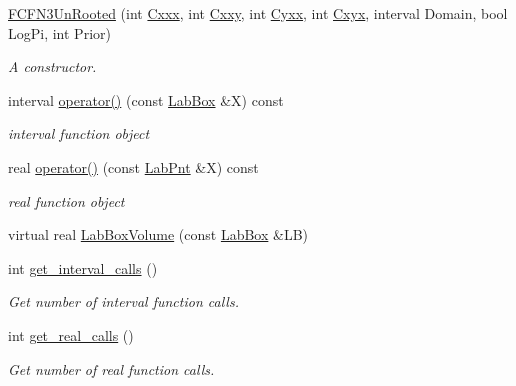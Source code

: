 \begin{DoxyCompactItemize}
\item 
\hyperlink{classFCFN3UnRooted_a5f4f860f6a018258d428ac99b745b909}{\-F\-C\-F\-N3\-Un\-Rooted} (int \hyperlink{classFCFN3UnRooted_a52b3db1c0464e43eb76fd9c2f85f3adb}{\-Cxxx}, int \hyperlink{classFCFN3UnRooted_a9ef322fbaba733780643eb3f748c61e8}{\-Cxxy}, int \hyperlink{classFCFN3UnRooted_a8a1912c84680898ee998bfcc8e59cab2}{\-Cyxx}, int \hyperlink{classFCFN3UnRooted_aee129a305aebfe530f9025bdc5a64c22}{\-Cxyx}, interval \-Domain, bool \-Log\-Pi, int \-Prior)
\begin{DoxyCompactList}\small\item\em \-A constructor. \end{DoxyCompactList}\item 
interval \hyperlink{classFCFN3UnRooted_abaaaa5afcbd3a3c9baa2c6afb58bb5d6}{operator()} (const \hyperlink{classLabBox}{\-Lab\-Box} \&\-X) const 
\begin{DoxyCompactList}\small\item\em interval function object \end{DoxyCompactList}\item 
real \hyperlink{classFCFN3UnRooted_a598796f5e3db2e01ad871ab84833a1fb}{operator()} (const \hyperlink{classLabPnt}{\-Lab\-Pnt} \&\-X) const 
\begin{DoxyCompactList}\small\item\em real function object \end{DoxyCompactList}\item 
virtual real \hyperlink{classFCFN3UnRooted_aae39656be045741eddc3590529aec2b6}{\-Lab\-Box\-Volume} (const \hyperlink{classLabBox}{\-Lab\-Box} \&\-L\-B)
\item 
int \hyperlink{classFCFN3UnRooted_a8cd2bfdf21a3f8a8109dce3a80833b98}{get\-\_\-interval\-\_\-calls} ()
\begin{DoxyCompactList}\small\item\em \-Get number of interval function calls. \end{DoxyCompactList}\item 
int \hyperlink{classFCFN3UnRooted_a56cccac7570877578c6337183c2153d3}{get\-\_\-real\-\_\-calls} ()
\begin{DoxyCompactList}\small\item\em \-Get number of real function calls. \end{DoxyCompactList}\end{DoxyCompactItemize}
